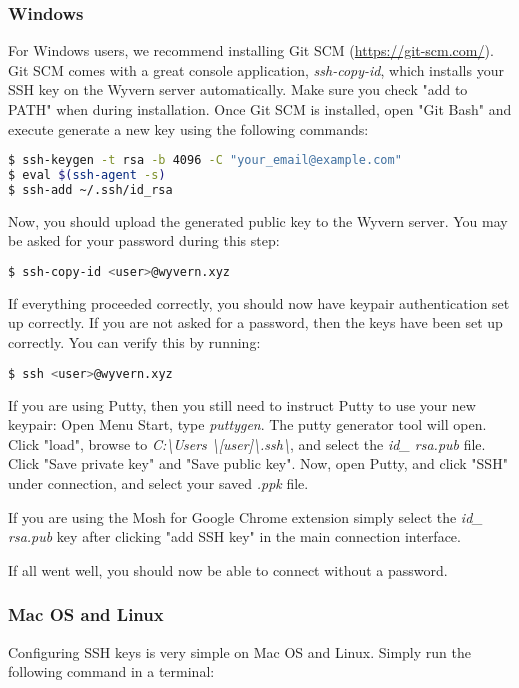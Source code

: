 \subsubsection{Windows}
For Windows users, we recommend installing Git SCM (\url{https://git-scm.com/}). Git SCM comes with a great console application, \textit{ssh-copy-id}, which installs your SSH key on the Wyvern server automatically. Make sure you check "add to PATH" when during installation. Once Git SCM is installed, open "Git Bash" and execute generate a new key using the following commands:

\begin{lstlisting}[language=bash]
$ ssh-keygen -t rsa -b 4096 -C "your_email@example.com"
$ eval $(ssh-agent -s)
$ ssh-add ~/.ssh/id_rsa
\end{lstlisting}

Now, you should upload the generated public key to the Wyvern server. You may be asked for your password during this step:

\begin{lstlisting}[language=bash]
$ ssh-copy-id <user>@wyvern.xyz
\end{lstlisting}

If everything proceeded correctly, you should now have keypair authentication set up correctly. If you are not asked for a password, then the keys have been set up correctly. You can verify this by running:

\begin{lstlisting}[language=bash]
$ ssh <user>@wyvern.xyz
\end{lstlisting}

If you are using Putty, then you still need to instruct Putty to use your new keypair: Open Menu Start, type \textit{puttygen}. The putty generator tool will open. Click "load", browse to \textit{C:\textbackslash Users \textbackslash [user]\textbackslash .ssh\textbackslash}, and select the \textit{id\_ rsa.pub} file. Click "Save private key" and "Save public key". Now, open Putty, and click "SSH" under connection, and select your saved \textit{.ppk} file.

If you are using the Mosh for Google Chrome extension simply select the \textit{id\_ rsa.pub} key after clicking "add SSH key" in the main connection interface.

If all went well, you should now be able to connect without a password.

\subsubsection{Mac OS and Linux}
Configuring SSH keys is very simple on Mac OS and Linux. Simply run the following command in a terminal:

